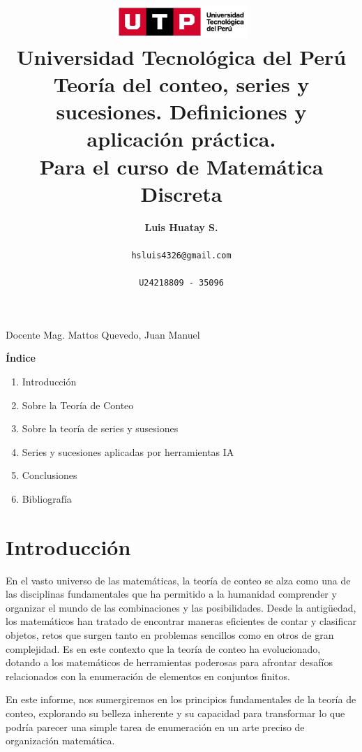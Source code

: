 \documentclass[11pt, a4paper]{article}
\title{
  \includegraphics[width=5cm]{./assets/logo-utp.png} \\
  \vspace{1cm}
  \textbf{Universidad Tecnológica del Perú} \\
  \vspace{3.5cm}
  \textbf{Teoría del conteo, series y sucesiones. Definiciones y aplicación práctica.} \\ 
  \vspace{1cm}
  \large \textbf{Para el curso de Matemática Discreta}
}
\author{\textbf{Luis Huatay S.}\\\\\texttt{hsluis4326@gmail.com}\\\\\texttt{U24218809 - 35096}}
\begin{document}
\maketitle
\begin{center}
Docente Mag. Mattos Quevedo, Juan Manuel
\end{center}
\restoregeometry

\newpage 

\textbf{Índice}
\begin{enumerate}
  \item Introducción
  \item Sobre la Teoría de Conteo
  \item Sobre la teoría de series y susesiones
  \item Series y sucesiones aplicadas por herramientas IA
  \item Conclusiones
  \item Bibliografía
\end{enumerate}

\newpage
\vspace*{\fill}
\section{Introducción}
  
En el vasto universo de las matemáticas, la teoría de conteo se alza como una de las disciplinas fundamentales que ha permitido a la humanidad comprender y organizar el mundo de las combinaciones y las posibilidades. Desde la antigüedad, los matemáticos han tratado de encontrar maneras eficientes de contar y clasificar objetos, retos que surgen tanto en problemas sencillos como en otros de gran complejidad. Es en este contexto que la teoría de conteo ha evolucionado, dotando a los matemáticos de herramientas poderosas para afrontar desafíos relacionados con la enumeración de elementos en conjuntos finitos.

En este informe, nos sumergiremos en los principios fundamentales de la teoría de conteo, explorando su belleza inherente y su capacidad para transformar lo que podría parecer una simple tarea de enumeración en un arte preciso de organización matemática.
\vspace*{\fill}

\newpage
\end{document}
